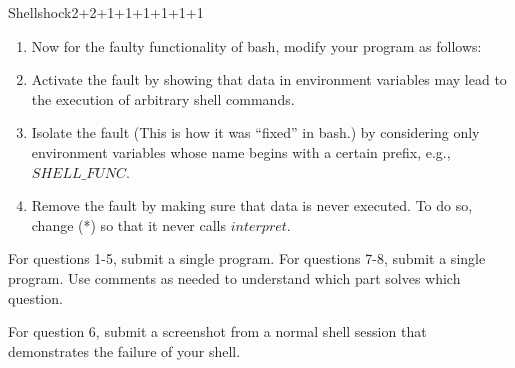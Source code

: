 \documentclass[a4paper]{article}
\begin{document}
\begin{problem}{Shellshock}{2+2+1+1+1+1+1+1}
\begin{enumerate}
\item Now for the faulty functionality of bash, modify your program as follows:

\item Activate the fault by showing that data in environment variables may lead to the execution of arbitrary shell commands.

\item Isolate the fault (This is how it was ``fixed'' in bash.) by considering only environment variables whose name begins with a certain prefix, e.g., $SHELL\_FUNC$.

\item Remove the fault by making sure that data is never executed.
To do so, change (*) so that it never calls $interpret$.
\end{enumerate}

For questions 1-5, submit a single program.
For questions 7-8, submit a single program.
Use comments as needed to understand which part solves which question.

For question 6, submit a screenshot from a normal shell session that demonstrates the failure of your shell.
\end{problem}
\end{document}
